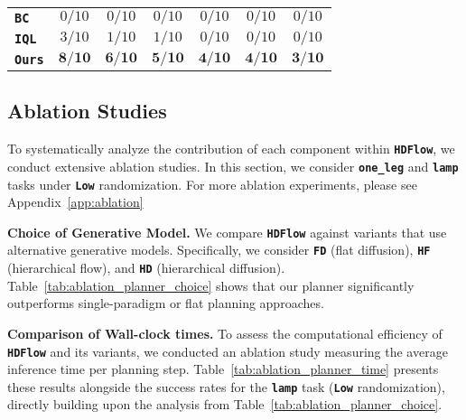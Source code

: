 \documentclass{article} %
\begin{document}
\begin{figure*}[t]
\begin{minipage}{0.485\textwidth}
{\begin{tabular}{lcc|cc|cc}
        \midrule
        \texttt{\textbf{BC}} & $0/10$ & $0/10$ & $0/10$ & $0/10$ & $0/10$ & $0/10$ \\
        \texttt{\textbf{IQL}} & $3/10$ & $1/10$ & $1/10$ & $0/10$ & $0/10$ & $0/10$ \\
        \midrule
        \rowcolor[HTML]{a6e3e9}
        \texttt{\textbf{Ours}} & $\mathbf{8/10}$ & $\mathbf{6/10}$ & $\mathbf{5/10}$ & $\mathbf{4/10}$ & $\mathbf{4/10}$ & $\mathbf{3/10}$\\
        \bottomrule
        \end{tabular}
        }
        \label{tab:real_results}
    \end{minipage}
    \vspace{-15pt}
\end{figure*}
\fi

\subsection{Ablation Studies}
\vspace{-5pt}
To systematically analyze the contribution of each component within \texttt{\textbf{HDFlow}}, we conduct extensive ablation studies. In this section, we consider \texttt{\textbf{one\_leg}} and \texttt{\textbf{lamp}} tasks under \texttt{\textbf{Low}} randomization. For more ablation experiments, please see Appendix~\ref{app:ablation}


\textbf{Choice of Generative Model.}
We compare \texttt{\textbf{HDFlow}} against variants that use alternative generative models. Specifically, we consider \texttt{\textbf{FD}} (flat diffusion), \texttt{\textbf{HF}} (hierarchical flow), and \texttt{\textbf{HD}} (hierarchical diffusion). Table~\ref{tab:ablation_planner_choice} shows that our planner significantly outperforms single-paradigm or flat planning approaches.

\textbf{Comparison of Wall-clock times.}
To assess the computational efficiency of \texttt{\textbf{HDFlow}} and its variants, we conducted an ablation study measuring the average inference time per planning step. Table~\ref{tab:ablation_planner_time} presents these results alongside the success rates for the \texttt{\textbf{lamp}} task (\texttt{\textbf{Low}} randomization), directly building upon the analysis from Table~\ref{tab:ablation_planner_choice}. 
\end{document}
